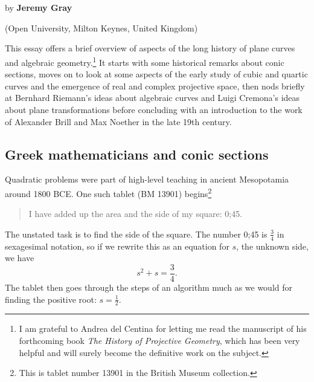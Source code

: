 




\def\jg#1{{{\bf {Jeremy says [* }{#1{\bf\ *]} }}}}

\chapter[A historical essay on some topics in algebraic geometry, by
Jeremy Gray]{}

\vspace*{-40pt}
{\Large by {\bf Jeremy Gray}}

(Open University, Milton Keynes, United Kingdom)

\vskip30pt

\label{Appendix-History}
This essay offers a brief overview of aspects of the long history of plane curves and algebraic geometry.\footnote{I am grateful to Andrea del Centina for letting me read the manuscript of his forthcoming book \emph{The History of Projective Geometry}, which has been very helpful and will surely become the definitive work on the subject.}   It starts with some historical remarks about conic sections, moves on to look at some aspects of the early study of cubic and quartic curves and the emergence of real and complex projective space, then nods briefly at Bernhard Riemann's ideas about algebraic curves and Luigi Cremona's ideas about plane transformations before concluding with an introduction to the work of Alexander Brill and Max Noether in the late 19th century. 

\section{Greek mathematicians and conic sections}
Quadratic problems were part of high-level teaching in ancient Mesopotamia around 1800 BCE. One such tablet (BM 13901) begins\footnote{This is tablet number 13901 in the British Museum collection.} 
\begin{quote}
I have added up the area and the side of my square: 0;45.
\end{quote}
The unstated task is to find the side of the square.
The number 0;45 is $\frac{3}{4}$ in sexagesimal notation, so if we rewrite this as an equation for $s$, the unknown side, we have
$$s^2 + s = \frac{3}{4}.$$
The tablet then goes through the steps of an algorithm much as we would for finding the positive root: $s = \frac{1}{2}.$ 

